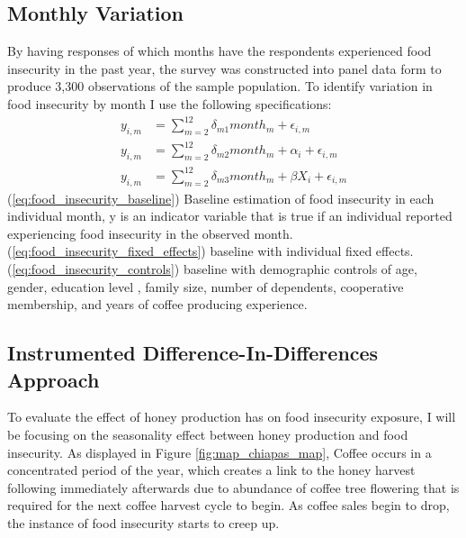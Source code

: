 \documentclass[../main.tex]{subfiles}
\begin{document}
\subsection{Monthly Variation}

By having responses of which months have the respondents experienced food insecurity in the past year, the survey was constructed into panel data form to produce 3,300 observations of the sample population. To identify variation in food insecurity by month I use the following specifications:
\begin{align}
\label{eq:food_insecurity_baseline}
y_{i,m} &= \sum^{12}_{m=2}\delta_{m1}month_m + \epsilon_{i,m} \\
\label{eq:food_insecurity_fixed_effects}
y_{i,m} &= \sum^{12}_{m=2}\delta_{m2}month_m + \alpha_{i} + \epsilon_{i,m} \\
\label{eq:food_insecurity_controls}
y_{i,m} &= \sum^{12}_{m=2}\delta_{m3}month_m + \beta{X}_{i} + \epsilon_{i,m}
\end{align}
(\ref{eq:food_insecurity_baseline}) Baseline estimation of food insecurity in each individual month, y is an indicator variable that is true if an individual reported experiencing food insecurity in the observed month. (\ref{eq:food_insecurity_fixed_effects}) baseline with individual fixed effects. (\ref{eq:food_insecurity_controls}) baseline with demographic controls of age, gender, education level , family size, number of dependents, cooperative membership, and years of coffee producing experience. 

\subsection{Instrumented Difference-In-Differences Approach}

To evaluate the effect of honey production has on food insecurity exposure, I will be focusing on the seasonality effect between honey production and food insecurity. As displayed in Figure \ref{fig:map_chiapas_map}, Coffee occurs in a concentrated period of the year, which creates a link to the honey harvest following immediately afterwards due to abundance of coffee tree flowering that is required for the next coffee harvest cycle to begin. As coffee sales begin to drop, the instance of food insecurity starts to creep up. 	
\end{document}
